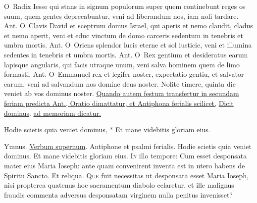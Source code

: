 \begin{multicols*}{2}
\lettrine[lines=2]{\zallmancaps \color{Red} O}{}\ Radix Iesse qui stans in signum populorum super quem continebunt reges os suum, quem gentes deprecabuntur, veni ad liberandum nos, iam noli tardare. {\color{Red} Ant.}
\lettrine[lines=2]{\zallmancaps \color{Blue} O}{}\ Clavis David et sceptrum domus Israel, qui aperis et nemo claudit, cladus et nemo aperit, veni et educ vinctum de domo carceris sedentum in tenebris et umbra mortis. {\color{Red} Ant.}
\lettrine[lines=2]{\zallmancaps \color{Red} O}{}\ Oriens splendor lucis eterne et sol iusticie, veni et illumina sedentes in tenebris et umbra mortis. {\color{Red} Ant.}
\lettrine[lines=2]{\zallmancaps \color{Blue} O}{}\ Rex gentium et desideratus earum lapisque angularis, qui facis utraque unum, veni salva hominem quem de limo formasti. {\color{Red} Ant.}
\lettrine[lines=2]{\zallmancaps \color{Red} O}{}\ Emmanuel rex et legifer noster, expectatio gentiu, et salvator earum, veni ad salvandum nos domine deus noster.
 Nolite timere, quinta die veniet ab vos dominus noster.
\newline \ul{Quando autem festum transfertur in secundam feriam predicta Ant., Oratio dimattatur, et Antiphona ferialis scilicet,} \hyperlink{ant-dicit-dominus}{Dicit dominus}. \ul{ad memoriam dicatur.}
{\color{Red} }
\par {}
\begin{invitatory}
{Hodie scietis quia veniet dominus, * Et mane videbitis gloriam eius.}
\end{invitatory}
{\color{Red} Ymnus.} \hyperlink{verbum}{Verbum supernum}. Antiphone et psalmi ferialis. \V Hodie scietis quia veniet dominus. \R Et mane videbitis gloriam eius.
\lettrine[lines=2]{\zallmancaps \color{Blue} I}{n} illo tempore: Cum esset desponsata mater eius Maria Ioseph: ante quam convenirent inventa est in utero habens de Spiritu Sancto. Et reliqua.
\lettrine[lines=2]{\zallmancaps \color{Red} Q}{ue} fuit necessitas ut desponsata esset Maria Ioseph, nisi propterea quatenus hoc sacramentum diabolo celaretur, et ille malignus fraudis commenta adversus desponsatam virginem nulla penitus invenisset?

\end{multicols*}
